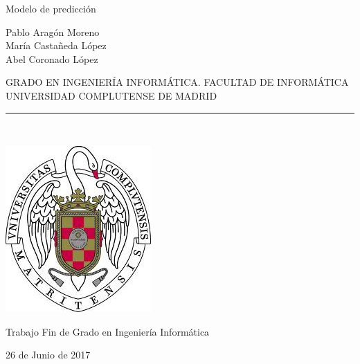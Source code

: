 \begin{center}

   \vspace{1cm}

   {\Large Modelo de predicción}\\

   \vspace{0.5cm}

   \vspace{0.5cm}

   {\large Pablo Aragón Moreno}\\
   {\large María Castañeda López}\\
   {\large Abel Coronado López}\\
 
   \vspace{0.5cm}

   GRADO EN INGENIERÍA INFORMÁTICA. FACULTAD DE INFORMÁTICA\\
   UNIVERSIDAD COMPLUTENSE DE MADRID \\


   \vspace{0.65cm}
   \rule{2in}{0.5pt}\\
   \vspace{0.85cm}

  \includegraphics[height=2.5in]{figures/escudo.jpg}
  

   \vspace{0.5cm}
Trabajo Fin de Grado en Ingeniería Informática

   \vspace{0.5cm}


  26 de Junio de 2017\\
   \vspace{1cm}

\end{center}

